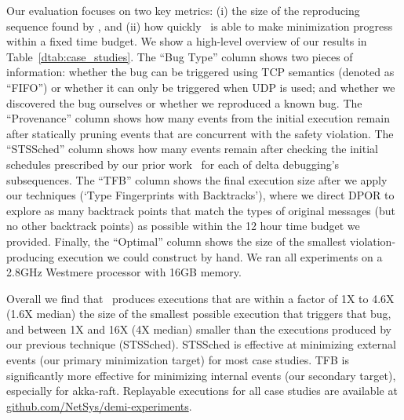 
Our evaluation focuses on two key metrics: (i) the size of
the reproducing sequence found by \sys, and (ii) how quickly
\sys~is able to make minimization progress within a fixed time
budget. We show a high-level overview
of our results in Table~\ref{dtab:case_studies}.
The ``Bug Type'' column shows two pieces of information: whether the bug can be
triggered using TCP semantics (denoted as ``FIFO'')
or whether it can only be triggered when UDP is used; and whether we discovered
the bug ourselves or whether we
reproduced a known bug. The ``Provenance'' column shows how many events from the initial execution
remain after statically pruning events
that are concurrent with the safety violation.
The ``STSSched'' column shows how many events remain after checking the initial schedules
prescribed by our prior work~\cite{sts2014} for each of delta debugging's
subsequences. The ``TFB'' column shows the final execution size after
we apply our techniques (`Type Fingerprints with Backtracks'), where we direct
DPOR to explore as many backtrack points that match the types of original
messages (but no other
backtrack points) as possible within the 12 hour time budget we provided.
Finally, the ``Optimal'' column shows the size of the smallest
violation-producing execution we could construct by hand.
We ran all experiments on a 2.8GHz Westmere processor with 16GB memory.

Overall we find
that \sys~produces executions that are within
a factor of 1X to 4.6X (1.6X median) the size of the smallest possible execution
that triggers that bug, and between 1X and 16X (4X median) smaller than the
executions produced by our previous technique (STSSched).
STSSched is effective at minimizing external events (our primary minimization
target) for most case studies. TFB is
significantly more effective for minimizing internal events (our secondary
target), especially for akka-raft.
Replayable executions for all case studies are available at
\href{https://github.com/NetSys/demi-experiments}{github.com/NetSys/demi-experiments}.


